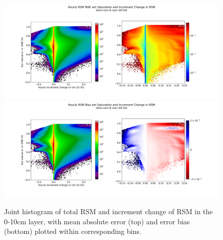 \begin{figure}[hp!]
    \centering

    \includegraphics[width=.96\linewidth,draft=false]{figures/grid-eval_lstm-rsm-9_full/eval-grid_full_lstm-rsm-9_rsm-10_hist-state-increment_abs-err.png}
    \includegraphics[width=.96\linewidth,draft=false]{figures/grid-eval_lstm-rsm-9_full/eval-grid_full_lstm-rsm-9_rsm-10_hist-state-increment_bias.png}

    \caption{Joint histogram of total RSM and increment change of RSM in the 0-10cm layer, with mean absolute error (top) and error bias (bottom) plotted within corresponding bins.}
    \label{lstm-rsm-9-sihist-rsm-10}
\end{figure}

